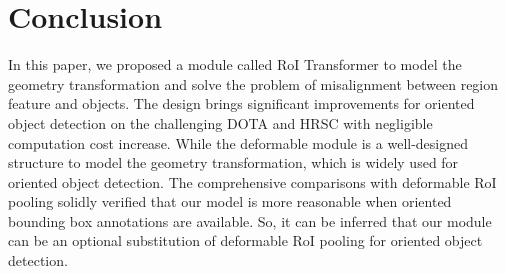 \documentclass[11pt,onecolumn]{article}         \usepackage[top=3.6cm, bottom=3.2cm, left=2.3cm, right=2.3cm]{geometry}
\begin{document}
\section{Conclusion}
In this paper, we proposed a module called RoI Transformer to model the geometry transformation and solve the problem of misalignment between region feature and objects. The design brings significant improvements for oriented object detection on the challenging DOTA and HRSC with negligible computation cost increase. While the deformable module is a well-designed structure to model the geometry transformation, which is widely used for oriented object detection. The comprehensive comparisons with deformable RoI pooling solidly verified that our model is more reasonable when oriented bounding box annotations are available. So, it can be inferred that our module can be an optional substitution of deformable RoI pooling for oriented object detection.


{\small


}
\end{document}
